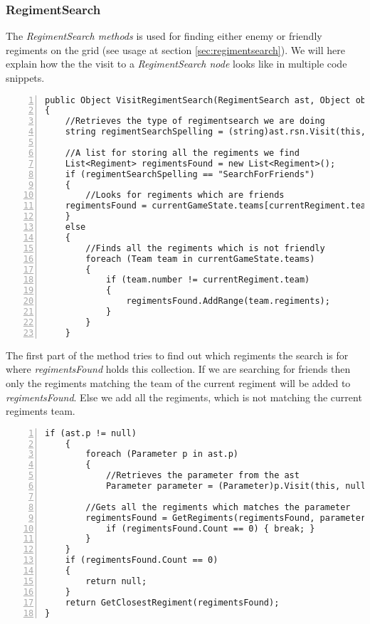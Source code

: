 	\subsubsection{RegimentSearch}
		The {\it RegimentSearch methods} is used for finding either enemy or friendly regiments on 
		the grid (see usage at section \ref{sec:regimentsearch}). 
		We will here explain how the the visit to a {\it RegimentSearch node} looks like in multiple code snippets.
		\begin{lstlisting}[basicstyle=\small\sffamily,
			keywords={break,case,const,continue,default,else,enum,
			for,if,return,switch,while,do,long,void,int,float,double,
			char,struct,typedef,include,size\_t},
			keywordstyle={\color{blue}},
			comment={[l]{//}}, morecomment={[s]{/*}{*/}}, commentstyle=\itshape,
			columns={[l]flexible}, numbers=left, numberstyle=\tiny,
			frameround=fftt, frame=shadowbox, captionpos=b,
			caption={1. part of visit of RegimentSearch node in the class BehaviourInterpreter},
			label=impl:regsearch1]		
public Object VisitRegimentSearch(RegimentSearch ast, Object obj)
{
	//Retrieves the type of regimentsearch we are doing
	string regimentSearchSpelling = (string)ast.rsn.Visit(this, null);

	//A list for storing all the regiments we find
	List<Regiment> regimentsFound = new List<Regiment>();
	if (regimentSearchSpelling == "SearchForFriends")
	{
		//Looks for regiments which are friends
	regimentsFound = currentGameState.teams[currentRegiment.team].regiments;
	}
	else
	{
		//Finds all the regiments which is not friendly
		foreach (Team team in currentGameState.teams)
		{
			if (team.number != currentRegiment.team)
			{
				regimentsFound.AddRange(team.regiments);
			}
		}
	}
		\end{lstlisting}
		The first part of the method tries to find out which regiments the search is for where {\it regimentsFound} holds this collection. 
		If we are searching for friends then only the regiments matching the team of the current regiment will be added to {\it regimentsFound}.
		Else we add all the regiments, which is not matching the current regiments team.
		\begin{lstlisting}[basicstyle=\small\sffamily,
			keywords={break,case,const,continue,default,else,enum,
			for,if,return,switch,while,do,long,void,int,float,double,
			char,struct,typedef,include,size\_t},
			keywordstyle={\color{blue}},
			comment={[l]{//}}, morecomment={[s]{/*}{*/}}, commentstyle=\itshape,
			columns={[l]flexible}, numbers=left, numberstyle=\tiny,
			frameround=fftt, frame=shadowbox, captionpos=b,
			caption={1. part of visit of RegimentSearch node in the class BehaviourInterpreter},
			label=impl:regsearch2]
	if (ast.p != null)
	{
		foreach (Parameter p in ast.p)
		{
			//Retrieves the parameter from the ast
			Parameter parameter = (Parameter)p.Visit(this, null);

		//Gets all the regiments which matches the parameter
		regimentsFound = GetRegiments(regimentsFound, parameter);
			if (regimentsFound.Count == 0) { break; }
		}
	}
	if (regimentsFound.Count == 0)
	{
		return null;
	}
	return GetClosestRegiment(regimentsFound);
}
	\end{lstlisting}
